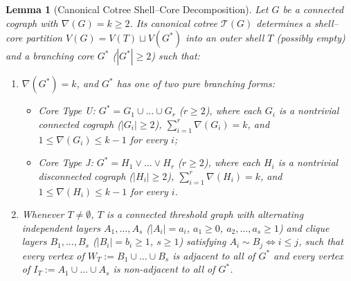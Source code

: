 \documentclass[11pt,a4paper]{article}
\newtheorem{lemma}[theorem]{Lemma}
\theoremstyle{definition}
\begin{document}
\begin{lemma}[Canonical Cotree Shell--Core Decomposition]\label{lem:shell_core}
  Let $G$ be a connected cograph with $\nabla(G) = k \ge 2$. Its canonical cotree $\mathcal{T}(G)$ determines a shell--core partition $V(G) = V(T) \sqcup V(G^*)$ into an outer \emph{shell} $T$ (possibly empty) and a \emph{branching core} $G^*$ ($|G^*| \ge 2$) such that:
  \begin{enumerate}
    \item $\nabla(G^*) = k$, and $G^*$ has one of two pure branching forms:
    \begin{itemize}
      \item \emph{Core Type U:} $G^* = G_1 \cup \dots \cup G_r$ ($r \ge 2$), where each $G_i$ is a nontrivial connected cograph ($|G_i| \ge 2$), $\sum_{i=1}^r \nabla(G_i) = k$, and $1 \le \nabla(G_i) \le k - 1$ for every $i$;
      \item \emph{Core Type J:} $G^* = H_1 \vee \dots \vee H_r$ ($r \ge 2$), where each $H_i$ is a nontrivial disconnected cograph ($|H_i| \ge 2$), $\sum_{i=1}^r \nabla(H_i) = k$, and $1 \le \nabla(H_i) \le k - 1$ for every $i$.
    \end{itemize}
    \item Whenever $T \ne \emptyset$, $T$ is a connected threshold graph with alternating independent layers $A_1,\dots,A_s$ ($|A_i|=a_i$, $a_1 \ge 0$, $a_2,\dots,a_s \ge 1$) and clique layers $B_1,\dots,B_s$ ($|B_i|=b_i \ge 1$, $s \ge 1$) satisfying $A_i \sim B_j \iff i \le j$, such that every vertex of $W_T := B_1 \cup \dots \cup B_s$ is adjacent to all of $G^*$ and every vertex of $I_T := A_1 \cup \dots \cup A_s$ is non-adjacent to all of $G^*$.
  \end{enumerate}
\end{lemma}
\end{document}
